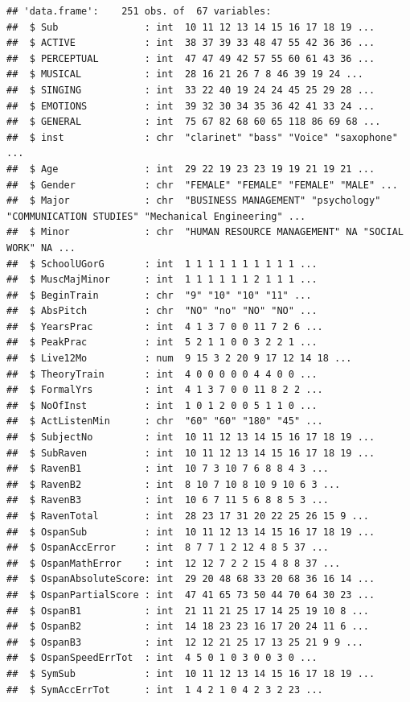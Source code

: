 \documentclass[]{book}
\theoremstyle{definition}
\theoremstyle{definition}
\theoremstyle{definition}
\theoremstyle{remark}
\begin{document}
\begin{verbatim}
## 'data.frame':    251 obs. of  67 variables:
##  $ Sub               : int  10 11 12 13 14 15 16 17 18 19 ...
##  $ ACTIVE            : int  38 37 39 33 48 47 55 42 36 36 ...
##  $ PERCEPTUAL        : int  47 47 49 42 57 55 60 61 43 36 ...
##  $ MUSICAL           : int  28 16 21 26 7 8 46 39 19 24 ...
##  $ SINGING           : int  33 22 40 19 24 24 45 25 29 28 ...
##  $ EMOTIONS          : int  39 32 30 34 35 36 42 41 33 24 ...
##  $ GENERAL           : int  75 67 82 68 60 65 118 86 69 68 ...
##  $ inst              : chr  "clarinet" "bass" "Voice" "saxophone" ...
##  $ Age               : int  29 22 19 23 23 19 19 21 19 21 ...
##  $ Gender            : chr  "FEMALE" "FEMALE" "FEMALE" "MALE" ...
##  $ Major             : chr  "BUSINESS MANAGEMENT" "psychology" "COMMUNICATION STUDIES" "Mechanical Engineering" ...
##  $ Minor             : chr  "HUMAN RESOURCE MANAGEMENT" NA "SOCIAL WORK" NA ...
##  $ SchoolUGorG       : int  1 1 1 1 1 1 1 1 1 1 ...
##  $ MuscMajMinor      : int  1 1 1 1 1 1 2 1 1 1 ...
##  $ BeginTrain        : chr  "9" "10" "10" "11" ...
##  $ AbsPitch          : chr  "NO" "no" "NO" "NO" ...
##  $ YearsPrac         : int  4 1 3 7 0 0 11 7 2 6 ...
##  $ PeakPrac          : int  5 2 1 1 0 0 3 2 2 1 ...
##  $ Live12Mo          : num  9 15 3 2 20 9 17 12 14 18 ...
##  $ TheoryTrain       : int  4 0 0 0 0 0 4 4 0 0 ...
##  $ FormalYrs         : int  4 1 3 7 0 0 11 8 2 2 ...
##  $ NoOfInst          : int  1 0 1 2 0 0 5 1 1 0 ...
##  $ ActListenMin      : chr  "60" "60" "180" "45" ...
##  $ SubjectNo         : int  10 11 12 13 14 15 16 17 18 19 ...
##  $ SubRaven          : int  10 11 12 13 14 15 16 17 18 19 ...
##  $ RavenB1           : int  10 7 3 10 7 6 8 8 4 3 ...
##  $ RavenB2           : int  8 10 7 10 8 10 9 10 6 3 ...
##  $ RavenB3           : int  10 6 7 11 5 6 8 8 5 3 ...
##  $ RavenTotal        : int  28 23 17 31 20 22 25 26 15 9 ...
##  $ OspanSub          : int  10 11 12 13 14 15 16 17 18 19 ...
##  $ OspanAccError     : int  8 7 7 1 2 12 4 8 5 37 ...
##  $ OspanMathError    : int  12 12 7 2 2 15 4 8 8 37 ...
##  $ OspanAbsoluteScore: int  29 20 48 68 33 20 68 36 16 14 ...
##  $ OspanPartialScore : int  47 41 65 73 50 44 70 64 30 23 ...
##  $ OspanB1           : int  21 11 21 25 17 14 25 19 10 8 ...
##  $ OspanB2           : int  14 18 23 23 16 17 20 24 11 6 ...
##  $ OspanB3           : int  12 12 21 25 17 13 25 21 9 9 ...
##  $ OspanSpeedErrTot  : int  4 5 0 1 0 3 0 0 3 0 ...
##  $ SymSub            : int  10 11 12 13 14 15 16 17 18 19 ...
##  $ SymAccErrTot      : int  1 4 2 1 0 4 2 3 2 23 ...

\end{verbatim}
\end{document}
